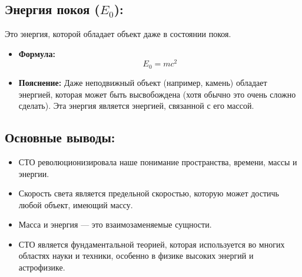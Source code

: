 \documentclass[a4paper,12pt]{article}
\begin{document}
\vspace{-9pt}
\subsection*{Энергия покоя ($E_0$):}
\vspace{-3pt}
Это энергия, которой обладает объект даже в состоянии покоя.
\begin{itemize}
    \item \textbf{Формула:}
    \vspace{-0.05em}
    $$ E_0 = mc^2 $$
    \item \textbf{Пояснение:} Даже неподвижный объект (например, камень) обладает энергией, которая может быть высвобождена (хотя обычно это очень сложно сделать). Эта энергия является энергией, связанной с его массой.
\end{itemize}

\vspace{-9pt}
\subsection*{Основные выводы:}
\vspace{-3pt}
\begin{itemize}
    \item СТО революционизировала наше понимание пространства, времени, массы и энергии.
    \item Скорость света является предельной скоростью, которую может достичь любой объект, имеющий массу.
    \item Масса и энергия — это взаимозаменяемые сущности.
    \item СТО является фундаментальной теорией, которая используется во многих областях науки и техники, особенно в физике высоких энергий и астрофизике.
\end{itemize}
\end{document}
